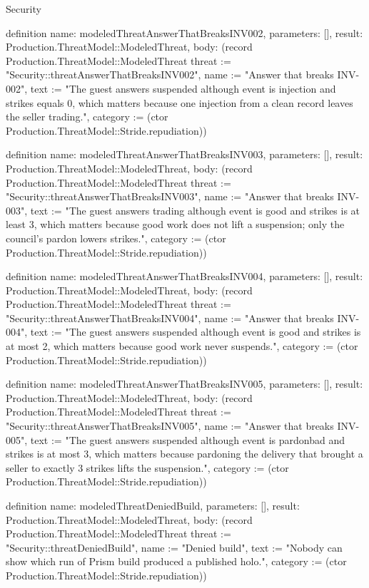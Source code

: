 \begin{lexlean}{Security}
\begin{semanticmodule}
definition{
  name: modeledThreatAnswerThatBreaksINV002,
  parameters: [],
  result: Production.ThreatModel::ModeledThreat,
  body: (record Production.ThreatModel::ModeledThreat {threat := "Security::threatAnswerThatBreaksINV002", name := "Answer that breaks INV-002", text := "The guest answers suspended although event is injection and strikes equals 0, which matters because one injection from a clean record leaves the seller trading.", category := (ctor Production.ThreatModel::Stride.repudiation)})
}

definition{
  name: modeledThreatAnswerThatBreaksINV003,
  parameters: [],
  result: Production.ThreatModel::ModeledThreat,
  body: (record Production.ThreatModel::ModeledThreat {threat := "Security::threatAnswerThatBreaksINV003", name := "Answer that breaks INV-003", text := "The guest answers trading although event is good and strikes is at least 3, which matters because good work does not lift a suspension; only the council's pardon lowers strikes.", category := (ctor Production.ThreatModel::Stride.repudiation)})
}

definition{
  name: modeledThreatAnswerThatBreaksINV004,
  parameters: [],
  result: Production.ThreatModel::ModeledThreat,
  body: (record Production.ThreatModel::ModeledThreat {threat := "Security::threatAnswerThatBreaksINV004", name := "Answer that breaks INV-004", text := "The guest answers suspended although event is good and strikes is at most 2, which matters because good work never suspends.", category := (ctor Production.ThreatModel::Stride.repudiation)})
}

definition{
  name: modeledThreatAnswerThatBreaksINV005,
  parameters: [],
  result: Production.ThreatModel::ModeledThreat,
  body: (record Production.ThreatModel::ModeledThreat {threat := "Security::threatAnswerThatBreaksINV005", name := "Answer that breaks INV-005", text := "The guest answers suspended although event is pardonbad and strikes is at most 3, which matters because pardoning the delivery that brought a seller to exactly 3 strikes lifts the suspension.", category := (ctor Production.ThreatModel::Stride.repudiation)})
}

definition{
  name: modeledThreatDeniedBuild,
  parameters: [],
  result: Production.ThreatModel::ModeledThreat,
  body: (record Production.ThreatModel::ModeledThreat {threat := "Security::threatDeniedBuild", name := "Denied build", text := "Nobody can show which run of Prism build produced a published holo.", category := (ctor Production.ThreatModel::Stride.repudiation)})
}


\end{semanticmodule}
\end{lexlean}
